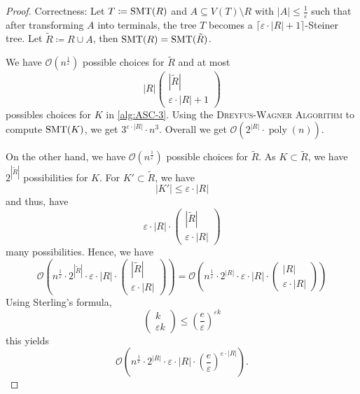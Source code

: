 \documentclass[../skript.tex]{subfiles}
\begin{document}
\begin{proof}
Correctness: Let $T \coloneqq \operatorname{SMT}(R)$ and $A \subseteq V(T) \setminus R$ with $|A| \leq \frac{1}{\varepsilon}$ such that after transforming $A$ into terminals, the tree $T$ becomes a $\lceil \varepsilon \cdot |R| + 1 \rceil$-Steiner tree.
Let $\tilde{R} \coloneqq R \cup A$, then $\operatorname{SMT}(R) = \operatorname{SMT}(\tilde{R})$.

We have $\mathcal{O}\left( n^\frac{1}{\varepsilon} \right)$ possible choices for $\tilde{R}$ and at most
\[
	|R| \begin{pmatrix}
	|\tilde{R}| \\ \varepsilon \cdot |R| + 1
	\end{pmatrix}
\]
possibles choices for $K$ in \cref{alg:ASC-3}. Using the \textsc{Dreyfus-Wagner Algorithm} to compute $\operatorname{SMT}(K)$, we get $3^{\varepsilon \cdot |R|} \cdot n^3$. Overall we get $\mathcal{O} \left( 2^{|R|} \cdot \operatorname{poly}(n) \right)$.

On the other hand, we have $\mathcal{O}\left( n^\frac{1}{\varepsilon} \right)$ possible choices for $\tilde{R}$. As $K \subset \tilde{R}$, we have $2^{|\tilde{R}|}$ possibilities for $K$.
For $K' \subset \tilde{R}$, we have
\[
	|K'| \leq \varepsilon \cdot |R|
\]
and thus, have
\[
	\varepsilon \cdot |R| \cdot \begin{pmatrix}
	|\tilde{R}| \\ \varepsilon \cdot |R|
	\end{pmatrix}
\]
many possibilities.
Hence, we have
\[
	\mathcal{O} \left( n^\frac{1}{\varepsilon} \cdot 2^{|\tilde{R}|} \cdot \varepsilon \cdot |R| \cdot \begin{pmatrix}
	|\tilde{R}| \\ \varepsilon \cdot |R|
	\end{pmatrix} \right) = \mathcal{O} \left( n^\frac{1}{\varepsilon} \cdot 2^{|R|} \cdot \varepsilon \cdot |R| \cdot \begin{pmatrix}
	|R| \\ \varepsilon \cdot |R|
	\end{pmatrix} \right)
\]
Using Sterling's formula,
\[
	\begin{pmatrix}
		k \\ \varepsilon k
	\end{pmatrix} \leq \left( \frac{e}{\varepsilon} \right)^{\varepsilon k}
\]
this yields
\[
	\mathcal{O} \left( n^\frac{1}{\varepsilon} \cdot 2^{|R|} \cdot \varepsilon \cdot |R| \cdot \left( \frac{e}{\varepsilon} \right)^{\varepsilon \cdot |R|} \right).
\]
\end{proof}
\end{document}
